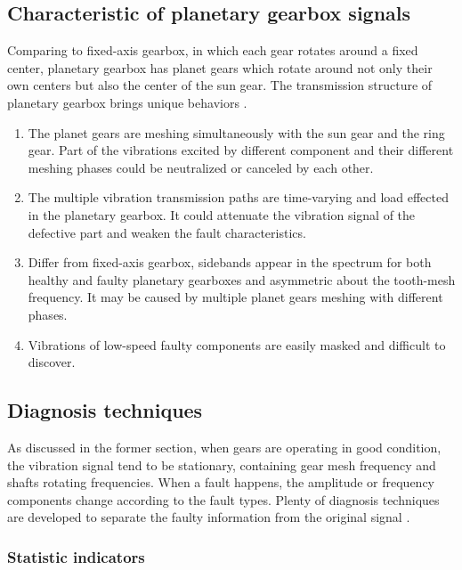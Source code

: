 \subsection{ Characteristic of planetary gearbox signals}

Comparing to fixed-axis gearbox, in which each gear rotates around a fixed center, planetary gearbox has planet gears which rotate around not only their own centers but also the center of the sun gear. The transmission structure of planetary gearbox brings unique behaviors \cite{review}.
\begin{enumerate}
	\item The planet gears are meshing simultaneously with the sun gear and the ring gear. Part of the vibrations excited by different component and their different meshing phases could be neutralized or canceled by each other.
	
	\item The multiple vibration transmission paths are time-varying and load effected in the planetary gearbox. It could attenuate the vibration signal of the defective part and weaken the fault characteristics.
	
	\item Differ from fixed-axis gearbox, sidebands appear in the spectrum for both healthy and faulty planetary gearboxes and asymmetric about the tooth-mesh frequency. It may be caused by multiple planet gears meshing with different phases.
	
	\item Vibrations of low-speed faulty components are easily masked and difficult to discover.
\end{enumerate}


\subsection{Diagnosis techniques}

As discussed in the former section, when gears are operating in good condition, the vibration signal tend to be stationary, containing gear mesh frequency and shafts rotating frequencies. When a fault happens, the amplitude or frequency components change according to the fault types.
Plenty of diagnosis techniques are developed to separate the faulty information from the original signal \cite{practical}.

\subsubsection{Statistic indicators}

